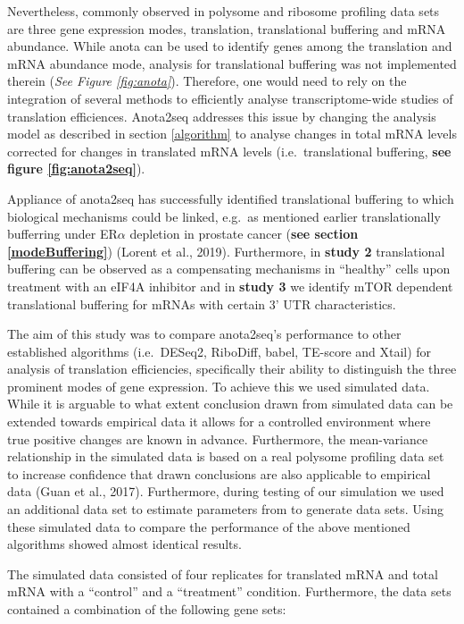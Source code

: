 \documentclass[
  12pt,
  openany]{book}
\begin{document}
Nevertheless, commonly observed in polysome and ribosome profiling data sets are three gene expression modes, translation, translational buffering and mRNA abundance. While anota can be used to identify genes among the translation and mRNA abundance mode, analysis for translational buffering was not implemented therein (\emph{See Figure \ref{fig:anota}}). Therefore, one would need to rely on the integration of several methods to efficiently analyse transcriptome-wide studies of translation efficiences. Anota2seq addresses this issue by changing the analysis model as described in section \ref{algorithm} to analyse changes in total mRNA levels corrected for changes in translated mRNA levels (i.e.~translational buffering, \textbf{see figure \ref{fig:anota2seq}}).

Appliance of anota2seq has successfully identified translational buffering to which biological mechanisms could be linked, e.g.~as mentioned earlier translationally bufferring under ER\(\alpha\) depletion in prostate cancer (\textbf{see section \ref{modeBuffering}}) (Lorent et al., 2019). Furthermore, in \textbf{study 2} translational buffering can be observed as a compensating mechanisms in ``healthy'' cells upon treatment with an eIF4A inhibitor and in \textbf{study 3} we identify mTOR dependent translational buffering for mRNAs with certain 3' UTR characteristics.

The aim of this study was to compare anota2seq's performance to other established algorithms (i.e.~DESeq2, RiboDiff, babel, TE-score and Xtail) for analysis of translation efficiencies, specifically their ability to distinguish the three prominent modes of gene expression. To achieve this we used simulated data. While it is arguable to what extent conclusion drawn from simulated data can be extended towards empirical data it allows for a controlled environment where true positive changes are known in advance. Furthermore, the mean-variance relationship in the simulated data is based on a real polysome profiling data set to increase confidence that drawn conclusions are also applicable to empirical data (Guan et al., 2017). Furthermore, during testing of our simulation we used an additional data set to estimate parameters from to generate data sets. Using these simulated data to compare the performance of the above mentioned algorithms showed almost identical results.

The simulated data consisted of four replicates for translated mRNA and total mRNA with a ``control'' and a ``treatment'' condition. Furthermore, the data sets contained a combination of the following gene sets:
\end{document}
